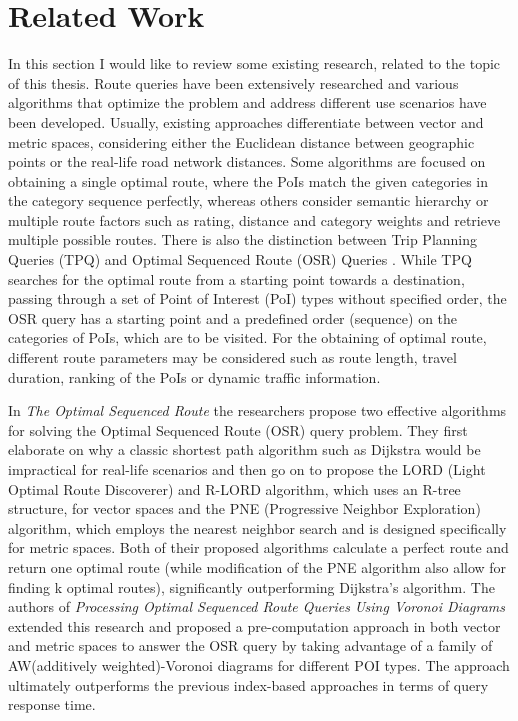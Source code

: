 \chapter{Related Work}
\label{sec:relwork}
In this section I would like to review some existing research, related to the topic of this thesis. Route queries have been extensively researched and various algorithms that optimize the problem and address different use scenarios have been developed. Usually, existing approaches differentiate between vector and metric spaces, considering either the Euclidean distance between geographic points or the real-life road network distances. Some algorithms are focused on obtaining a single optimal route, where the PoIs match the given categories in the category sequence perfectly, whereas others consider semantic hierarchy or multiple route factors such as rating, distance and category weights and retrieve multiple possible routes. There is also the distinction between Trip Planning Queries (TPQ) \cite{tpq} and Optimal Sequenced Route (OSR) Queries  \cite{OSR}. While TPQ searches for the optimal route from a starting point towards a destination, passing through a set of Point of Interest (PoI) types without specified order, the OSR query has a starting point and a predefined order (sequence) on the categories of PoIs, which are to be visited. For the obtaining of optimal route, different route parameters may be considered such as route length, travel duration, ranking of the PoIs or dynamic traffic information.

In \textit{The Optimal Sequenced Route} \cite{OSR} the researchers propose two effective algorithms for solving the Optimal Sequenced Route (OSR) query problem. They first elaborate on why a classic shortest path algorithm such as Dijkstra would be impractical for real-life scenarios and then go on to propose the LORD (Light Optimal Route Discoverer) and R-LORD algorithm, which uses an R-tree structure, for vector spaces and the PNE (Progressive Neighbor Exploration) algorithm, which employs the nearest neighbor search and is designed specifically for metric spaces. Both of their proposed algorithms calculate a perfect route and return one optimal route (while modification of the PNE algorithm also allow for finding k optimal routes), significantly outperforming Dijkstra's algorithm. The authors of \textit{Processing Optimal Sequenced Route Queries Using Voronoi Diagrams} \cite{voronoi} extended this research and proposed a pre-computation approach in both vector and metric spaces to answer the OSR query by taking advantage of a family of AW(additively weighted)-Voronoi diagrams for different POI types. The approach ultimately outperforms the previous index-based approaches in terms of query response time.

